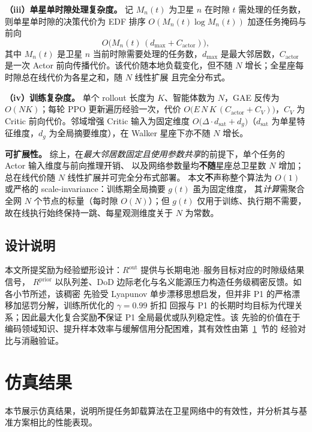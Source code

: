 \documentclass[a4paper,11pt]{article}
\begin{document}
\noindent\textbf{（iii）单星单时隙处理复杂度。}
记 $M_n(t)$ 为卫星 $n$ 在时隙 $t$ 需处理的任务数，则单星单时隙的决策代价为 EDF 排序
$O(M_n(t)\log M_n(t))$ 加逐任务掩码与前向
\begin{equation}
O\big(M_n(t)\,(d_{\max}+C_{\mathrm{actor}})\big),
\label{eq:online_complexity}
\end{equation}
其中 $M_n(t)$ 是卫星 $n$ 当前时隙需要处理的任务数，$d_{\max}$ 是最大邻居数，$C_{\mathrm{actor}}$ 是一次 Actor
前向传播代价。该代价随本地负载变化，但不随 $N$ 增长；全星座每时隙总在线代价为各星之和，随 $N$ 线性扩展
且完全分布式。

\noindent\textbf{（iv）训练复杂度。}
单个 rollout 长度为 $K$、智能体数为 $N$，GAE 反传为 $O(NK)$；每轮 PPO 更新遍历经验一次，代价
$O\big(E\,N\,K\,(C_{\mathrm{actor}}+C_V)\big)$，$C_V$ 为 Critic 前向代价。邻域增强 Critic 输入为固定维度
$O\big(\Delta\cdot d_{\mathrm{sat}}+d_g\big)$（$d_{\mathrm{sat}}$ 为单星特征维度，$d_g$ 为全局摘要维度），在 Walker
星座下亦不随 $N$ 增长。

\noindent\textbf{可扩展性。}
综上，在\emph{最大邻居数固定且使用参数共享}的前提下，单个任务的 Actor 输入维度与前向推理开销、
以及网络参数量均\textbf{不随}星座总卫星数 $N$ 增加；总在线代价随 $N$ 线性扩展并可完全分布式部署。
本文\textbf{不}声称整个算法为 $O(1)$ 或严格的 scale-invariance：训练期全局摘要 $g(t)$ 虽为固定维度，
其\emph{计算}需聚合全网 $N$ 个节点的标量（每时隙 $O(N)$）；但 $g(t)$ 仅用于训练、执行期不需要，
故在线执行始终保持一跳、每星观测维度关于 $N$ 为常数。

\subsection{设计说明}
\label{subsec:design_note}

本文所提奖励为经验塑形设计：$R^{\mathrm{out}}$ 提供与长期电池--服务目标对应的时隙级结果信号，
$R^{\mathrm{prior}}$ 以队列差、DoD 边际老化与名义能源压力构造任务级稠密反馈。如各小节所述，该稠密
先验受 Lyapunov 单步漂移思想启发，但并非 P1 的严格漂移加惩罚分解，训练所优化的 $\gamma{=}0.99$ 折扣
回报与 P1 的长期时均目标为代理关系；因此最大化复合奖励\textbf{不}保证 P1 全局最优或队列稳定性。该
先验的价值在于编码领域知识、提升样本效率与缓解信用分配困难，其有效性由第~\ref{sec:simulation}~节的
经验对比与消融验证。

\section{仿真结果}
\label{sec:simulation}
本节展示仿真结果，说明所提任务卸载算法在卫星网络中的有效性，并分析其与基准方案相比的性能表现。
\end{document}
